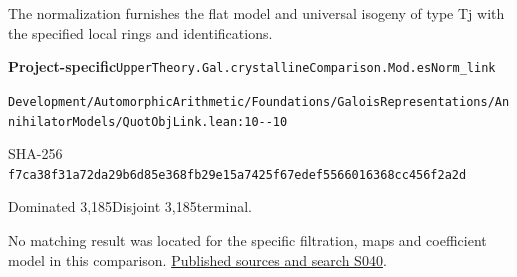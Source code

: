 
\begin{formalstatement}[D193]\label{decomp:D193}
The normalization furnishes the flat model and universal isogeny of type Tj with the specified local rings and identifications.
\end{formalstatement}
{\small\raggedright\noindent\textsf{\bfseries Project-specific}\quad \nolinkurl{UpperTheory.Gal.crystallineComparison.Mod.esNorm_link}\par\noindent \nolinkurl{Development/AutomorphicArithmetic/Foundations/GaloisRepresentations/AnnihilatorModels/QuotObjLink.lean:10--10}\par\noindent SHA-256 \nolinkurl{f7ca38f31a72da29b6d85e368fb29e15a7425f67edef5566016368cc456f2a2d}\par\noindent Dominated 3,185\quad Disjoint 3,185\quad terminal.\par}
No matching result was located for the specific filtration, maps and coefficient model in this comparison.
\hyperref[lit:S040]{Published sources and search S040}.
